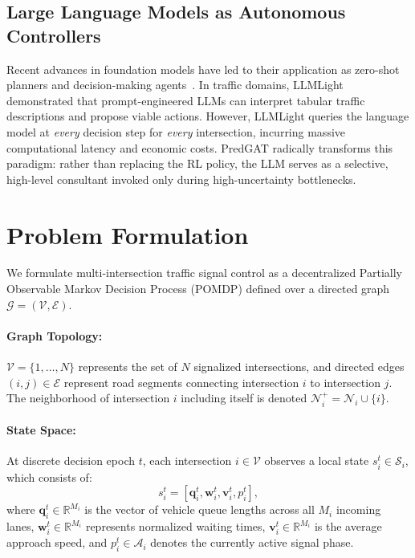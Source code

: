 \documentclass[11pt,a4paper,twocolumn]{article}
\begin{document}
\subsection{Large Language Models as Autonomous Controllers}
Recent advances in foundation models have led to their application as zero-shot planners and decision-making agents~\cite{wang2024survey}. In traffic domains, LLMLight~\cite{lai2024llmlight} demonstrated that prompt-engineered LLMs can interpret tabular traffic descriptions and propose viable actions. However, LLMLight queries the language model at \textit{every} decision step for \textit{every} intersection, incurring massive computational latency and economic costs. PredGAT radically transforms this paradigm: rather than replacing the RL policy, the LLM serves as a selective, high-level consultant invoked only during high-uncertainty bottlenecks.

\section{Problem Formulation}
\label{sec:prelim}

We formulate multi-intersection traffic signal control as a decentralized Partially Observable Markov Decision Process (POMDP) defined over a directed graph $\mathcal{G} = (\mathcal{V}, \mathcal{E})$.

\paragraph{Graph Topology:} $\mathcal{V} = \{1, \dots, N\}$ represents the set of $N$ signalized intersections, and directed edges $(i, j) \in \mathcal{E}$ represent road segments connecting intersection $i$ to intersection $j$. The neighborhood of intersection $i$ including itself is denoted $\mathcal{N}_i^+ = \mathcal{N}_i \cup \{i\}$.

\paragraph{State Space:} At discrete decision epoch $t$, each intersection $i \in \mathcal{V}$ observes a local state $s_i^t \in \mathcal{S}_i$, which consists of:
\begin{equation}
    s_i^t = \left[ \mathbf{q}_i^t, \mathbf{w}_i^t, \mathbf{v}_i^t, p_i^t \right],
\end{equation}
where $\mathbf{q}_i^t \in \mathbb{R}^{M_i}$ is the vector of vehicle queue lengths across all $M_i$ incoming lanes, $\mathbf{w}_i^t \in \mathbb{R}^{M_i}$ represents normalized waiting times, $\mathbf{v}_i^t \in \mathbb{R}^{M_i}$ is the average approach speed, and $p_i^t \in \mathcal{A}_i$ denotes the currently active signal phase.
\end{document}
